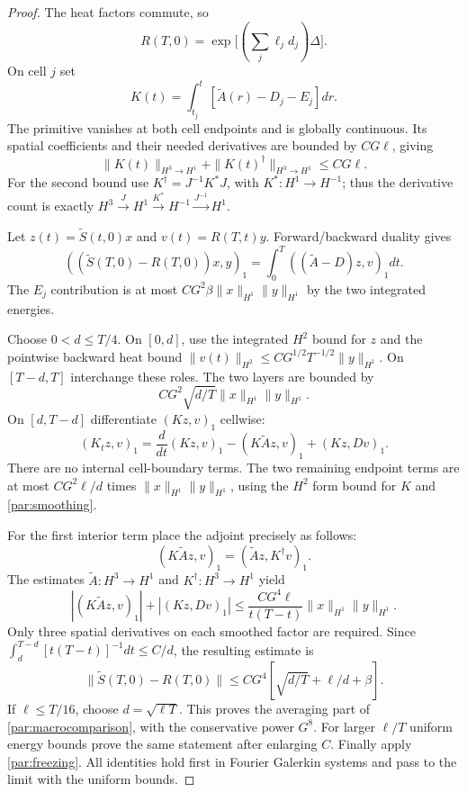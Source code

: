\documentclass[11pt,a4paper]{amsart}
\theoremstyle{definition}
\theoremstyle{remark}
\numberwithin{equation}{section}
\begin{document}
\begin{proof}
The heat factors commute, so
\[
 R(T,0)=\exp\bigl[(\sum_j\ell_jd_j)\Delta\bigr].
\]
On cell $j$ set
\[
 K(t)=\int_{t_j}^t[\widetilde A(r)-D_j-E_j]dr.
\]
The primitive vanishes at both cell endpoints and is globally continuous.
Its spatial coefficients and their needed derivatives are bounded by
$CG\ell$, giving
\begin{equation}\label{par:primitive}
 \|K(t)\|_{H^3\to H^1}+
 \|K(t)^\dagger\|_{H^3\to H^1}\le CG\ell.
\end{equation}
For the second bound use $K^\dagger=J^{-1}K^*J$, with
$K^*:H^1\to H^{-1}$; thus the derivative count is exactly
$H^3\xrightarrow JH^1\xrightarrow{K^*}H^{-1}\xrightarrow{J^{-1}}H^1$.

Let $z(t)=\widetilde S(t,0)x$ and $v(t)=R(T,t)y$. Forward/backward duality
gives
\begin{equation}\label{par:duality}
 ((\widetilde S(T,0)-R(T,0))x,y)_1
 =\int_0^T((\widetilde A-D)z,v)_1dt.
\end{equation}
The $E_j$ contribution is at most
$CG^2\beta\|x\|_{H^1}\|y\|_{H^1}$ by the two integrated energies.

Choose $0<d\le T/4$. On $[0,d]$, use the integrated $H^2$ bound for $z$
and the pointwise backward heat bound
$\|v(t)\|_{H^2}\le CG^{1/2}T^{-1/2}\|y\|_{H^1}$. On $[T-d,T]$
interchange these roles. The two layers are bounded by
\begin{equation}\label{par:layers}
 CG^2\sqrt{d/T}\|x\|_{H^1}\|y\|_{H^1}.
\end{equation}
On $[d,T-d]$ differentiate $(Kz,v)_1$ cellwise:
\begin{equation}\label{par:ibp}
 (K_tz,v)_1=\frac d{dt}(Kz,v)_1
             -(K\widetilde Az,v)_1+(Kz,Dv)_1.
\end{equation}
There are no internal cell-boundary terms. The two remaining endpoint terms
are at most $CG^2\ell/d$ times $\|x\|_{H^1}\|y\|_{H^1}$, using the
$H^2$ form bound for $K$ and \eqref{par:smoothing}.

For the first interior term place the adjoint precisely as follows:
\[
 (K\widetilde Az,v)_1=(\widetilde Az,K^\dagger v)_1.
\]
The estimates $\widetilde A:H^3\to H^1$ and
$K^\dagger:H^3\to H^1$ yield
\[
 |(K\widetilde Az,v)_1|+|(Kz,Dv)_1|
 \le\frac{CG^4\ell}{t(T-t)}\|x\|_{H^1}\|y\|_{H^1}.
\]
Only three spatial derivatives on each smoothed factor are required.
Since $\int_d^{T-d}[t(T-t)]^{-1}dt\le C/d$, the resulting estimate is
\[
 \|\widetilde S(T,0)-R(T,0)\|
 \le CG^4[\sqrt{d/T}+\ell/d+\beta].
\]
If $\ell\le T/16$, choose $d=\sqrt{\ell T}$. This proves the averaging
part of \eqref{par:macrocomparison}, with the conservative power $G^8$.
For larger $\ell/T$ uniform energy bounds prove the same statement after
enlarging $C$. Finally apply \eqref{par:freezing}. All identities hold first
in Fourier Galerkin systems and pass to the limit with the uniform bounds.
\end{proof}
\end{document}
